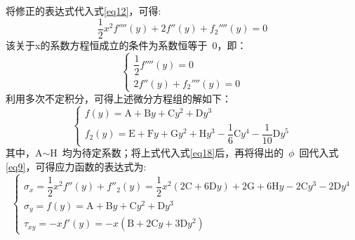 将修正的表达式代入式\eqref{eq12}，可得:
\begin{equation}\label{eq19}
    \frac{1}{2}x^2f''''(y)+ 2f''(y)+f_2''''(y) = 0
\end{equation}  
该关于x的系数方程恒成立的条件为系数恒等于~0，即：
\begin{equation}\label{eq20}
    \left\{
        \begin{array}{l}
            \dfrac{1}{2}f''''(y) = 0 \\
            2f''(y)+f_2''''(y) = 0
        \end{array}
    \right.
\end{equation} 
利用多次不定积分，可得上述微分方程组的解如下：
\begin{equation}\label{eq21}
    \left\{
        \begin{array}{l}
            f(y) = \text{A}+\text{B}y+\text{C}y^2+\text{D}y^3 \\
            f_2(y) = \text{E}+\text{F}y+\text{G}y^2+\text{H}y^3-\dfrac{1}{6}\text{C}y^4-\dfrac{1}{10}\text{D}y^5
        \end{array}
    \right.
\end{equation}
其中，A$\sim$H~均为待定系数；将上式代入式\eqref{eq18}后，再将得出的~$\phi$~回代入式\eqref{eq9}，可得应力函数的表达式为:
\begin{equation}\label{eq22}
    \left\{
        \begin{array}{l}
            \sigma_x = \dfrac{1}{2}x^2f''(y)+f''_2(y) = \dfrac{1}{2}x^2(2\text{C}+6\text{D}y)+2\text{G}+6\text{H}y-2\text{C}y^3-2\text{D}y^4\\
            \sigma_y = f(y) = \text{A}+\text{B}y+\text{C}y^2+\text{D}y^3\\
            \tau_{xy} = -xf'(y) = -x(\text{B}+2\text{C}y+3\text{D}y^2)
        \end{array}
    \right.
\end{equation}

